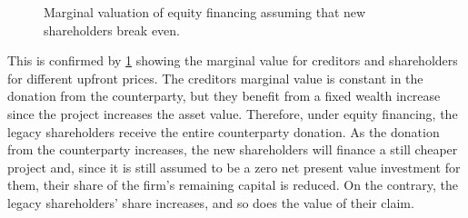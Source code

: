 \documentclass[main.tex]{subfiles}
\begin{document}
        \begin{figure}
            \centering
            \resizebox{\textwidth}{!}{%
                
            }
            \caption{
                Marginal valuation of equity financing 
                assuming that new shareholders break even.
            }
            \label{fig:marginal-value-equity-financing}
        \end{figure}

        This is confirmed by \cref{fig:marginal-value-equity-financing} showing
        the marginal value for creditors and shareholders for different upfront prices.
        The creditors marginal value is constant in the donation from the counterparty,
        but they benefit from a fixed wealth increase since the project increases the asset value.
        Therefore, under equity financing, 
        the legacy shareholders receive the entire counterparty donation.
        As the donation from the counterparty increases,
        the new shareholders will finance a still cheaper project 
        and, since it is still assumed to be a zero net present value investment for them, 
        their share of the firm's remaining capital is reduced.
        On the contrary, the legacy shareholders' share increases,
        and so does the value of their claim.
\end{document}
